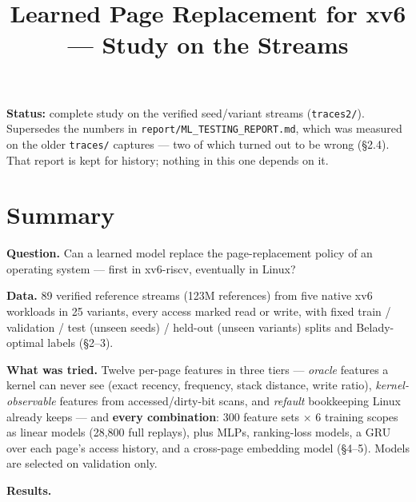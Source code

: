 \documentclass[10pt,a4paper]{article}
\title{Learned Page Replacement for xv6 — Study on the \code{traces2} Streams}
\date{}
\newcommand{\code}[1]{\texttt{#1}}
\begin{document}
\maketitle
\vspace{-2em}
\textbf{Status:} complete study on the verified seed/variant streams (\code{traces2/\allowbreak{}}). Supersedes the numbers in \code{report/\allowbreak{}ML\_\allowbreak{}TESTING\_\allowbreak{}REPORT.\allowbreak{}md}, which was measured on the older \code{traces/\allowbreak{}} captures — two of which turned out to be wrong (§2.4). That report is kept for history; nothing in this one depends on it.

\section*{Summary}

\textbf{Question.} Can a learned model replace the page-replacement policy of an operating system — first in xv6-riscv, eventually in Linux?

\textbf{Data.} 89 verified reference streams (123M references) from five native xv6 workloads in 25 variants, every access marked read or write, with fixed train / validation / test (unseen seeds) / held-out (unseen variants) splits and Belady-optimal labels (§2–3).

\textbf{What was tried.} Twelve per-page features in three tiers — \emph{oracle} features a kernel can never see (exact recency, frequency, stack distance, write ratio), \emph{kernel-observable} features from accessed/dirty-bit scans, and \emph{refault} bookkeeping Linux already keeps — and \textbf{every combination}: 300 feature sets × 6 training scopes as linear models (28,800 full replays), plus MLPs, ranking-loss models, a GRU over each page's access history, and a cross-page embedding model (§4–5). Models are selected on validation only.

\textbf{Results.}
\end{document}
